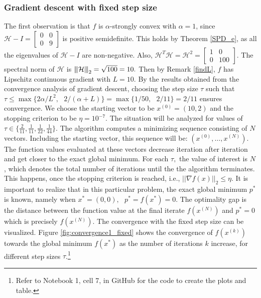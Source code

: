 \subsubsection{Gradient descent with fixed step size}
The first observation is that $f$ is $\alpha$-strongly convex with $\alpha=1$, since $\mathcal{H} - I = \begin{bmatrix}
0 & 0 \\
0 & 9
\end{bmatrix}$ is positive semidefinite. This holds by Theorem \ref{SPD_e}, as all the eigenvalues of $\mathcal{H} - I$ are non-negative. Also, $\mathcal{H}^{T}\mathcal{H} = \mathcal{H}^{2}= \begin{bmatrix}
1 & 0 \\
0 & 100
\end{bmatrix}$.
The spectral norm of $\mathcal{H}$ is ${\left\vert\kern-0.25ex\left\vert\kern-0.25ex\left\vert \mathcal{H} \right\vert\kern-0.25ex\right\vert\kern-0.25ex\right\vert}_{2} = \sqrt{100} = 10.$ Then by Remark \ref{findL}, $f$ has Lipschitz continuous gradient with $L=10.$ By the results obtained from the convergence analysis of gradient descent, choosing the step size $\tau$ such that $\tau \leq \max\{2\alpha / L^{2},\text{ } 2/(\alpha+L)\} = \max\{1/50,\text{ } 2/11\} = 2/11$ ensures convergence. We choose the starting vector to be $x^{(0)}=(10,2)$ and the stopping criterion to be $\eta = 10^{-7}.$ The situation will be analyzed for values of $\tau \in \{\frac{2}{11}, \frac{1}{11}, \frac{1}{22}, \frac{1}{44}\}.$ The algorithm computes a minimizing sequence consisting of $N$ vectors. Including the starting vector, this sequence will be: $(x^{(0)},\ldots,x^{(N)}).$ The function values evaluated at these vectors decrease iteration after iteration and get closer to the exact global minimum. For each $\tau,$ the value of interest is $N$, which denotes the total number of iterations until the the algorithm terminates. This happens, once the stopping criterion is reached, i.e.,  $||\nabla f(x)||_{2} \leq \eta$. It is important to realize that in this particular problem, the exact global minimum $p^{*}$ is known, namely when $x^{*}=(0,0),\text{ } p^{*} = f(x^{*}) = 0$. The optimality gap is the distance between the function value at the final iterate $f(x^{(N)})$ and $p^{*} = 0$ which is precisely $f(x^{(N)}).$  The convergence with the fixed step size can be visualized. Figure \ref{fig:convergence1_fixed} shows the convergence of $f(x^{(k)})$ towards the global minimum $f(x^{*})$ as the number of iterations $k$ increase, for different step sizes $\tau$.\footnote{Refer to Notebook 1, cell 7, in GitHub \cite{ThesisCode2023} for the code to create the plots and table.}

